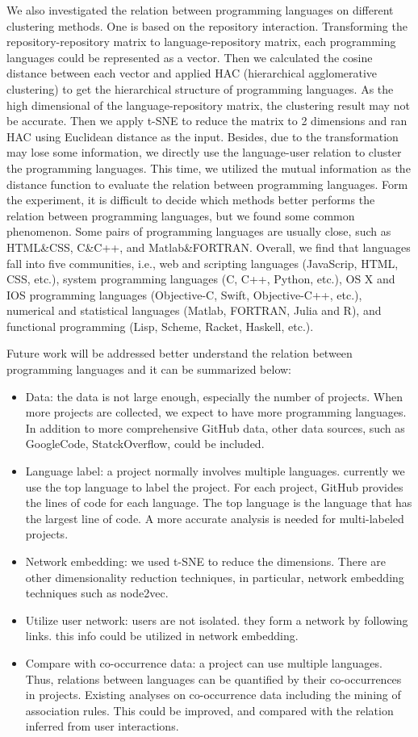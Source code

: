 \documentclass[12pt,oneside,final]{vlsithesis}
\begin{document}
We also investigated the relation between programming languages on different clustering methods. One is based on the repository interaction. Transforming the repository-repository matrix to language-repository matrix, each programming languages could be represented as a vector. Then we calculated the cosine distance between each vector and applied HAC (hierarchical agglomerative clustering) to get the hierarchical structure of programming languages.  As the high dimensional of the language-repository matrix, the clustering result may not be accurate. Then we apply t-SNE to reduce the matrix to 2 dimensions and ran HAC using Euclidean distance as the input. Besides, due to the transformation may lose some information, we directly use the language-user relation to cluster the programming languages. This time, we utilized the mutual information as the distance function to evaluate the relation between programming languages. Form the experiment, it is difficult to decide which methods better performs the relation between programming languages, but we found some common phenomenon. Some pairs of programming languages are usually close, such as HTML\&CSS, C\&C++, and Matlab\&FORTRAN. Overall, we find that languages fall into five communities, i.e., web and  scripting languages (JavaScrip, HTML, CSS, etc.), system programming languages (C, C++, Python, etc.), OS X and IOS programming languages (Objective-C, Swift, Objective-C++, etc.), numerical and statistical languages (Matlab, FORTRAN, Julia and R), and functional programming (Lisp, Scheme, Racket, Haskell, etc.).

Future work will be addressed better understand the relation between programming languages and it can be summarized below: 
\begin{itemize}
\item Data: the data is not large enough, especially the number of projects. When more projects are collected, we expect to have more programming languages. In addition to more comprehensive GitHub data, other data sources, such as GoogleCode, StatckOverflow, could be included. 
\item  Language label: a project normally involves multiple languages. currently we use the top language to label the project.  For each project, GitHub provides the lines of code for each language. The top language is the language that has the largest line of code.  A more accurate analysis is needed for multi-labeled projects. 
\item Network embedding:  we used t-SNE to reduce the dimensions. There are other dimensionality reduction techniques, in particular, network embedding techniques such as node2vec. 
\item Utilize user network: users are not isolated. they form a network by following links. this info could be utilized in network embedding. 
\item Compare with co-occurrence data: a project can use multiple languages. Thus, relations between languages can be quantified by their co-occurrences in projects. Existing analyses on co-occurrence data including the mining of association rules.  This could be improved, and compared with the relation inferred from user interactions. 
\end{itemize} 
\end{document}
